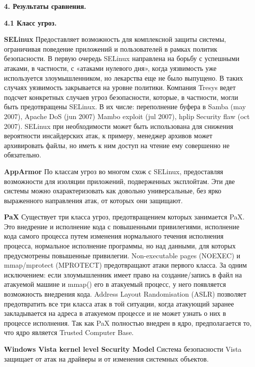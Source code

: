 \bigskip
{\bfseries 4. Результаты сравнения.} 

{\bfseries 4.1 Класс угроз.}

\bigskip

{\bfseries SELinux} 
Предоставляет возможность для комплексной защиты системы, ограничивая поведение приложений и пользователей в рамках политик безопасности. В первую очередь SELinux направлена на борьбу с успешными атаками, в частности, с «атаками нулевого дня», когда уязвимость уже используется злоумышленником, но лекарства еще не было выпущено. В таких случаях уязвимость закрывается на уровне политики. Компания Tresys ведет подсчет конкретных случаев угроз безопасности, которые, в частности, могли быть предотвращены SELinux. В их числе: переполнение буфера в Samba (may 2007), Apache DoS (jun 2007) Mambo exploit (jul 2007), hplip Security flaw (oct 2007). SELinux при необходимости может быть использована для снижения вероятности инсайдерских атак, к примеру, менеджер архивов может архивировать файлы, но иметь к ним доступ на чтение ему совершенно не обязательно. 

\bigskip
{\bfseries AppArmor}
По классам угроз во многом схож с SELinux, предоставляя возможности для изоляции приложений, подверженных эксплойтам. Эти две системы можно охарактеризовать как довольно универсальные, без ярко выраженного направления атак, от которых они защищают.

\bigskip
{\bfseries PaX } 
Существует три класса угроз, предотвращением которых занимается PaX. Это внедрение и исполнение кода с повышенными привилегиями, исполнение кода самого процесса путем изменения нормального течения исполнения процесса, нормальное исполнение программы, но над данными, для которых предусмотрены повышенные привилегии. Non-executable pages (NOEXEC) и mmap/mprotect (MPROTECT) предотвращают атаки первого класса. За одним исключением: если злоумышленник имеет право на создание/запись в файл на атакуемой машине и mmap() его в атакуемый процесс, у него появляется возможность внедрения кода. Address Layout Randomisation (ASLR) позволяет предотвратить все три класса атак в той ситуации, когда атакующий заранее закладывается на адреса в атакуемом процессе и не может узнать о них в процессе исполнения. Так как PaX полностью внедрен в ядро, предполагается то, что ядро является Trusted Computer Base. 

\bigskip
{\bfseries Windows Vista kernel level Security Model }
Система безопасности Vista защищает от атак на драйверы и от изменения системных объектов. 

